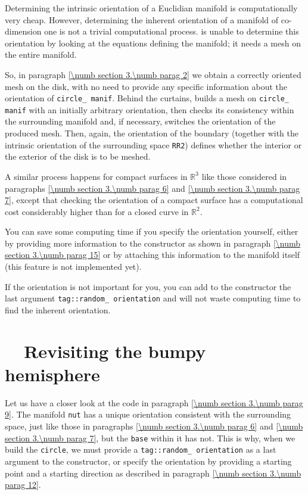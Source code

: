 Determining the intrinsic orientation of a Euclidian manifold is computationally
very cheap.
However, determining the inherent orientation of a manifold of co-dimension one is not
a trivial computational process.
{\ManiFEM} is unable to determine this orientation by looking at the equations defining
the manifold; it needs a mesh on the entire manifold.

So, in paragraph \ref{\numb section 3.\numb parag 2} we obtain a correctly oriented mesh
on the disk, with no need to provide any specific information about the orientation of
{\small\tt circle\_\,manif}.
Behind the curtains, {\maniFEM} builds a mesh on {\small\tt circle\_\,manif} with
an initially arbitrary orientation, then checks its consistency
within the surrounding manifold and, if necessary, switches the orientation of the produced mesh.
Then, again, the orientation of the boundary (together with the intrinsic orientation of
the surrounding space {\small\tt RR2}) defines whether the interior or the exterior of the
disk is to be meshed.

A similar process happens for compact surfaces in $ \mathbb{R}^3 $ like those
considered in paragraphs \ref{\numb section 3.\numb parag 6} and
\ref{\numb section 3.\numb parag 7},
except that checking the orientation of a compact surface has a computational cost
considerably higher than for a closed curve in $ \mathbb{R}^2 $.

You can save some computing time if you specify the orientation
yourself, either by providing more information to the {\small\tt {}} constructor as shown
in paragraph \ref{\numb section 3.\numb parag 15} or by attaching this information to
the manifold itself (this feature is not implemented yet).
 
If the orientation is not important for you, you can add to the {\small\tt {}} constructor
the last argument {\small\tt \textcolor{tag}{tag}::random\_\,orientation} and {\maniFEM} will not waste
computing time to find the inherent orientation.
\vskip 1mm

\section{~~Revisiting the bumpy hemisphere}\label{\numb section 3.\numb parag 14}

Let us have a closer look at the code in paragraph \ref{\numb section 3.\numb parag 9}.
The manifold {\small\tt nut} has a unique orientation consistent with the surrounding
space, just like those in paragraphs \ref{\numb section 3.\numb parag 6} and
\ref{\numb section 3.\numb parag 7}, but the {\small\tt base} within it has not.
This is why, when we build the {\small\tt circle}, we must provide a
{\small\tt \textcolor{tag}{tag}::random\_\,orientation} as a last argument to the {\small\tt {}} constructor,
or specify the orientation by providing a starting point and a starting direction
as described in paragraph \ref{\numb section 3.\numb parag 12}.

